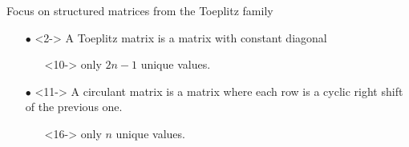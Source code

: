 \begin{frame}{Focus on structured matrices from the Toeplitz family}
\begin{minipage}{\textwidth}
\begin{tikzpicture}
    \end{tikzpicture}
  \end{minipage}


  \vspace{0.3cm}

  {\small
  \begin{itemize}[leftmargin=5pt]
    \item[$\bullet$]<2-> A Toeplitz matrix is a matrix with constant diagonal
    \begin{itemize}
      \item[\orange{$\rightarrow$}]<10-> only $2n - 1$ unique values.
    \end{itemize}
    \item[$\bullet$]<11-> A circulant matrix is a matrix where each row is a cyclic right shift of the previous one.
    \begin{itemize}
      \item[\orange{$\rightarrow$}]<16-> only $n$ unique values.
    \end{itemize}
  \end{itemize}
  }


\end{frame}

